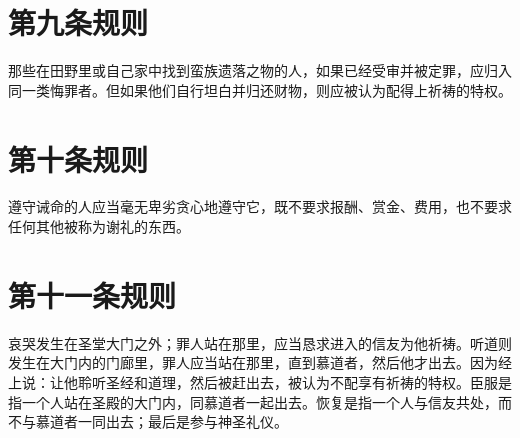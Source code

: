 
\section{第九条规则}

那些在田野里或自己家中找到蛮族遗落之物的人，如果已经受审并被定罪，应归入同一类悔罪者。但如果他们自行坦白并归还财物，则应被认为配得上祈祷的特权。\par


\section{第十条规则}

遵守诫命的人应当毫无卑劣贪心地遵守它，既不要求报酬、赏金、费用，也不要求任何其他被称为谢礼的东西。\par


\section{第十一条规则}

哀哭发生在圣堂大门之外；罪人站在那里，应当恳求进入的信友为他祈祷。听道则发生在大门内的门廊里，罪人应当站在那里，直到慕道者，然后他才出去。因为经上说：让他聆听圣经和道理，然后被赶出去，被认为不配享有祈祷的特权。臣服是指一个人站在圣殿的大门内，同慕道者一起出去。恢复是指一个人与信友共处，而不与慕道者一同出去；最后是参与神圣礼仪。\par

